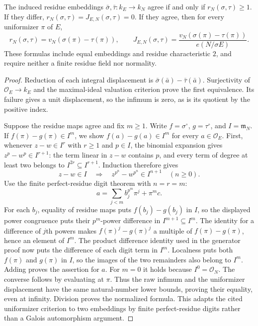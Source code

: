 \begin{lemma}
\label{fw:embedding-pair-uniformizer}
\leanok
The induced residue embeddings $\bar\sigma,\bar\tau:k_E\to k_N$
agree if and only if $r_N(\sigma,\tau)\geq1$. If they differ,
$r_N(\sigma,\tau)=J_{E,N}(\sigma,\tau)=0$. If they agree, then
for every uniformizer $\pi$ of $E$,
\[
 r_N(\sigma,\tau)=v_N(\sigma(\pi)-\tau(\pi)),\qquad
 J_{E,N}(\sigma,\tau)
 =\frac{v_N(\sigma(\pi)-\tau(\pi))}{e(N/\sigma E)}.
\]
These formulas include equal embeddings and residue characteristic
$2$, and require neither a finite residue field nor normality.
\end{lemma}
\begin{proof}
Reduction of each integral displacement is
$\bar\sigma(\bar a)-\bar\tau(\bar a)$. Surjectivity of
$\mathcal O_E\to k_E$ and the maximal-ideal valuation
criterion prove the first equivalence. Its failure gives a unit
displacement, so the infimum is zero, as is its quotient by the
positive index.

Suppose the residue maps agree and fix $m\geq1$. Write
$f=\sigma^\circ$, $g=\tau^\circ$, and
$I=\mathfrak m_N$. If $f(\pi)-g(\pi)\in I^m$, we show
$f(a)-g(a)\in I^m$ for every $a\in\mathcal O_E$.
First, whenever $z-w\in I^r$ with $r\geq1$ and $p\in I$,
the binomial expansion gives $z^p-w^p\in I^{r+1}$:
the term linear in $z-w$ contains $p$, and every term of
degree at least two belongs to $I^{2r}\subseteq I^{r+1}$.
Induction therefore gives
\[
 z-w\in I\quad\Longrightarrow\quad
 z^{p^n}-w^{p^n}\in I^{n+1}\quad(n\geq0).
\]
Use the finite perfect-residue digit theorem with $n=r=m$:
\[
 a=\sum_{j<m}b_j^{p^m}\pi^j+\pi^m c.
\]
For each $b_j$, equality of residue maps puts
$f(b_j)-g(b_j)$ in $I$, so the displayed power congruence
puts their $p^m$-power difference in
$I^{m+1}\subseteq I^m$. The identity for a difference of
$j$th powers makes $f(\pi)^j-g(\pi)^j$ a multiple of
$f(\pi)-g(\pi)$, hence an element of $I^m$. The product
difference identity used in the generator proof now puts the
difference of each digit term in $I^m$. Localness puts both
$f(\pi)$ and $g(\pi)$ in $I$, so the images of the two
remainders also belong to $I^m$. Adding proves the assertion
for $a$. For $m=0$ it holds because $I^0=\mathcal O_N$.
The converse follows by evaluating at $\pi$. Thus the raw
infimum and the uniformizer displacement have the same
natural-number lower bounds, proving their equality, even at
infinity. Division proves the normalized formula. This adapts
the cited uniformizer criterion to two embeddings by finite
perfect-residue digits rather than a Galois automorphism argument.
\end{proof}

